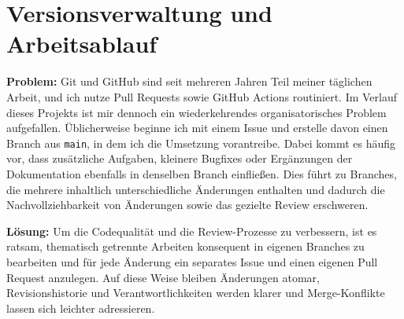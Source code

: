 \section*{Versionsverwaltung und Arbeitsablauf}

\textbf{Problem:} Git und GitHub sind seit mehreren Jahren Teil meiner täglichen Arbeit, und ich nutze Pull Requests sowie GitHub Actions routiniert. Im Verlauf dieses Projekts ist mir dennoch ein wiederkehrendes organisatorisches Problem aufgefallen. Üblicherweise beginne ich mit einem Issue und erstelle davon einen Branch aus \texttt{main}, in dem ich die Umsetzung vorantreibe. Dabei kommt es häufig vor, dass zusätzliche Aufgaben, kleinere Bugfixes oder Ergänzungen der Dokumentation ebenfalls in denselben Branch einfließen. Dies führt zu Branches, die mehrere inhaltlich unterschiedliche Änderungen enthalten und dadurch die Nachvollziehbarkeit von Änderungen sowie das gezielte Review erschweren.

\textbf{Lösung:} Um die Codequalität und die Review-Prozesse zu verbessern, ist es ratsam, thematisch getrennte Arbeiten konsequent in eigenen Branches zu bearbeiten und für jede Änderung ein separates Issue und einen eigenen Pull Request anzulegen. Auf diese Weise bleiben Änderungen atomar, Revisionshistorie und Verantwortlichkeiten werden klarer und Merge-Konflikte lassen sich leichter adressieren.

